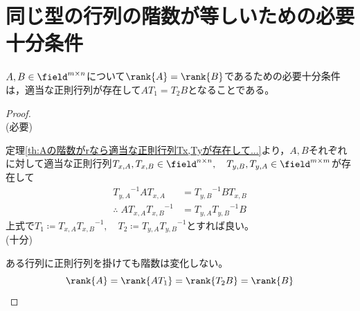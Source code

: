     \section{同じ型の行列の階数が等しいための必要十分条件}
        \begin{shadebox}
            $A,B\in\field^{m\times n}$について$\rank{A}=\rank{B}$であるための必要十分条件は，適当な正則行列が存在して$AT_1=T_2B$となることである。
        \end{shadebox}
        \begin{proof}
            \quad\\
            (必要)
            \par
            定理\ref{th:Aの階数がrなら適当な正則行列Tx,Tyが存在して...}より，$A,B$それぞれに対して適当な正則行列$T_{x,A},T_{x,B}\in\field^{n\times n},\quad T_{y,B},T_{y,A}\in\field^{m\times m}$が存在して
            \begin{align*}
                {T_{y,A}}^{-1}AT_{x,A} &= {T_{y,B}}^{-1}BT_{x,B}\\
                \therefore\;AT_{x,A}{T_{x,B}}^{-1} &= T_{y,A}{T_{y,B}}^{-1}B
            \end{align*}
            上式で$T_1\coloneq T_{x,A}{T_{x,B}}^{-1},\quad T_2\coloneq T_{y,A}{T_{y,B}}^{-1}$とすれば良い。
            \\
            (十分)
            \par
            ある行列に正則行列を掛けても階数は変化しない。
            \[\rank{A}=\rank{AT_1}=\rank{T_2B}=\rank{B}\]
        \end{proof}
